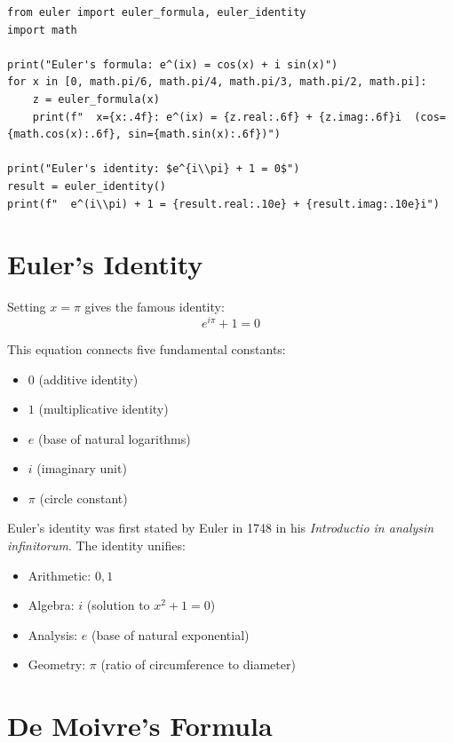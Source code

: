 \begin{lstlisting}[caption={Euler's formula verification}, label=lst:euler_formula]
from euler import euler_formula, euler_identity
import math

print("Euler's formula: e^(ix) = cos(x) + i sin(x)")
for x in [0, math.pi/6, math.pi/4, math.pi/3, math.pi/2, math.pi]:
    z = euler_formula(x)
    print(f"  x={x:.4f}: e^(ix) = {z.real:.6f} + {z.imag:.6f}i  (cos={math.cos(x):.6f}, sin={math.sin(x):.6f})")

print("Euler's identity: $e^{i\\pi} + 1 = 0$")
result = euler_identity()
print(f"  e^(i\\pi) + 1 = {result.real:.10e} + {result.imag:.10e}i")
\end{lstlisting}

\section{Euler's Identity}

Setting $x = \pi$ gives the famous identity:
\[
e^{i\pi} + 1 = 0
\]

This equation connects five fundamental constants:
\begin{itemize}
    \item $0$ (additive identity)
    \item $1$ (multiplicative identity)
    \item $e$ (base of natural logarithms)
    \item $i$ (imaginary unit)
    \item $\pi$ (circle constant)
\end{itemize}

\begin{example}
Euler's identity was first stated by Euler in 1748 in his \emph{Introductio in analysin infinitorum}.
The identity unifies:
\begin{itemize}
\item Arithmetic: $0, 1$
\item Algebra: $i$ (solution to $x^2 + 1 = 0$)
\item Analysis: $e$ (base of natural exponential)
\item Geometry: $\pi$ (ratio of circumference to diameter)
\end{itemize}
\end{example}

\section{De Moivre's Formula}

